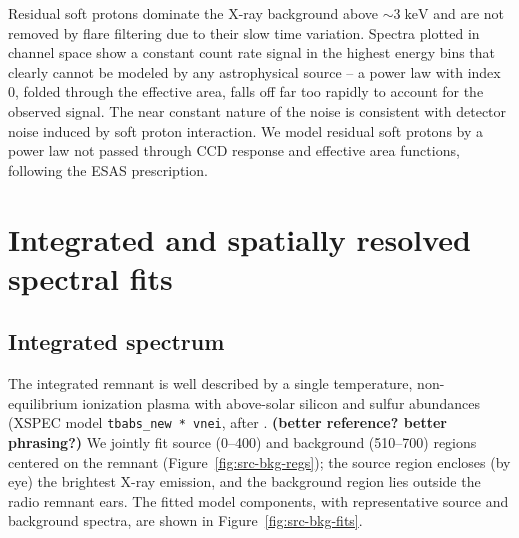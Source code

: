 \documentclass[preprint2,tighten,trackchanges]{aastex6}
\newcommand*{\mt}{\mathrm}
\newcommand*{\unit}[1]{\;\mt{#1}}  %
\begin{document}

Residual soft protons dominate the X-ray background above $\sim 3 \unit{keV}$
and are not removed by flare filtering due to their slow time variation.
Spectra plotted in channel space show a constant count rate signal in the
highest energy bins that clearly cannot be modeled by any astrophysical source
-- a power law with index 0, folded through the effective area, falls off far
too rapidly to account for the observed signal.
The near constant nature of the noise is consistent with detector noise induced
by soft proton interaction.
We model residual soft protons by a power law not passed through CCD response
and effective area functions, following the ESAS prescription.


\section{Integrated and spatially resolved spectral fits} \label{sec:spec}

\subsection{Integrated spectrum} \label{sec:src-bkg}

\begin{figure*}[]
    \label{fig:src-bkg-regs}  %
\end{figure*}

The integrated remnant is well described by a single temperature,
non-equilibrium ionization plasma with above-solar silicon and sulfur
abundances (XSPEC model \texttt{tbabs\_new * vnei}, after \citet{hamilton1983}.
\textbf{(better reference?  better phrasing?)}
We jointly fit source (0--400\arcsec) and background (510--700\arcsec) regions
centered on the remnant (Figure~\ref{fig:src-bkg-regs});
the source region encloses (by eye) the brightest X-ray emission, and the
background region lies outside the radio remnant ears.
The fitted model components, with representative source and background spectra,
are shown in Figure~\ref{fig:src-bkg-fits}.
\end{document}
